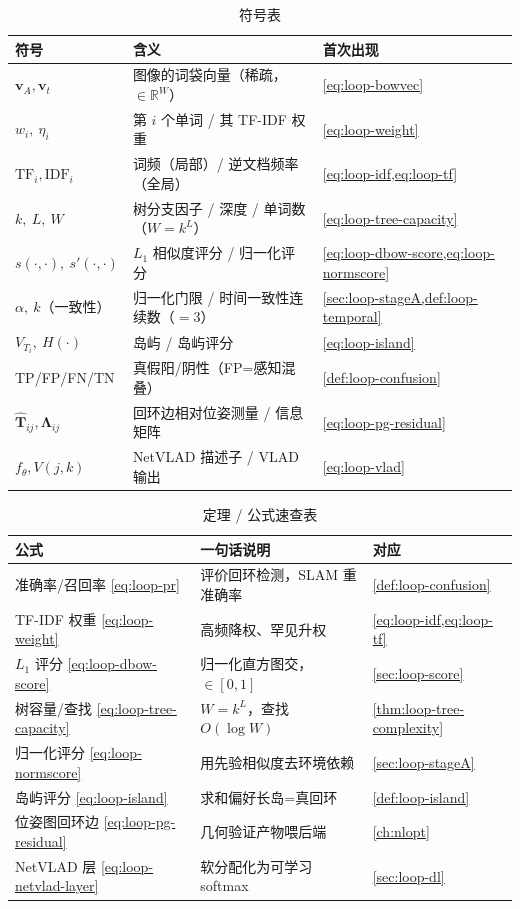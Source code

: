 \begin{table}[H]\centering\small
\caption{符号表}
\begin{tabular}{lll}
\toprule
符号 & 含义 & 首次出现 \\
\midrule
$\boldsymbol v_A,\boldsymbol v_t$ & 图像的词袋向量（稀疏，$\in\mathbb R^W$）& \cref{eq:loop-bowvec} \\
$w_i,\ \eta_i$ & 第 $i$ 个单词 / 其 TF-IDF 权重 & \cref{eq:loop-weight} \\
$\mathrm{TF}_i,\mathrm{IDF}_i$ & 词频（局部）/ 逆文档频率（全局）& \cref{eq:loop-idf,eq:loop-tf} \\
$k,\ L,\ W$ & 树分支因子 / 深度 / 单词数（$W=k^L$）& \cref{eq:loop-tree-capacity} \\
$s(\cdot,\cdot),\ s'(\cdot,\cdot)$ & $L_1$ 相似度评分 / 归一化评分 & \cref{eq:loop-dbow-score,eq:loop-normscore} \\
$\alpha,\ k$（一致性）& 归一化门限 / 时间一致性连续数（$=3$）& \cref{sec:loop-stageA,def:loop-temporal} \\
$V_{T_i},\ H(\cdot)$ & 岛屿 / 岛屿评分 & \cref{eq:loop-island} \\
TP/FP/FN/TN & 真假阳/阴性（FP=感知混叠）& \cref{def:loop-confusion} \\
$\hat{\mathbf T}_{ij},\boldsymbol\Lambda_{ij}$ & 回环边相对位姿测量 / 信息矩阵 & \cref{eq:loop-pg-residual} \\
$f_\theta,V(j,k)$ & NetVLAD 描述子 / VLAD 输出 & \cref{eq:loop-vlad} \\
\bottomrule
\end{tabular}
\end{table}

\begin{table}[H]\centering\small
\caption{定理 / 公式速查表}
\begin{tabular}{lll}
\toprule
公式 & 一句话说明 & 对应 \\
\midrule
准确率/召回率 \cref{eq:loop-pr} & 评价回环检测，SLAM 重准确率 & \cref{def:loop-confusion} \\
TF-IDF 权重 \cref{eq:loop-weight} & 高频降权、罕见升权 & \cref{eq:loop-idf,eq:loop-tf} \\
$L_1$ 评分 \cref{eq:loop-dbow-score} & 归一化直方图交，$\in[0,1]$ & \cref{sec:loop-score} \\
树容量/查找 \cref{eq:loop-tree-capacity} & $W=k^L$，查找 $O(\log W)$ & \cref{thm:loop-tree-complexity} \\
归一化评分 \cref{eq:loop-normscore} & 用先验相似度去环境依赖 & \cref{sec:loop-stageA} \\
岛屿评分 \cref{eq:loop-island} & 求和偏好长岛=真回环 & \cref{def:loop-island} \\
位姿图回环边 \cref{eq:loop-pg-residual} & 几何验证产物喂后端 & \cref{ch:nlopt} \\
NetVLAD 层 \cref{eq:loop-netvlad-layer} & 软分配化为可学习 softmax & \cref{sec:loop-dl} \\
\bottomrule
\end{tabular}
\end{table}

